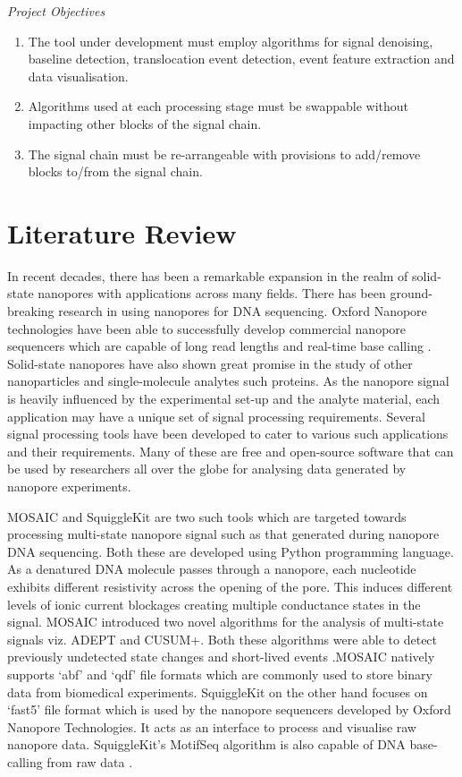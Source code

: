 \documentclass[journal]{IEEEtran}
\begin{document}
\noindent \textit{Project Objectives}
\begin{enumerate}
\item {The tool under development must employ algorithms for signal denoising, baseline detection, translocation event detection, event feature extraction and data visualisation.}
\item {Algorithms used at each processing stage must be swappable without impacting other blocks of the signal chain.}
\item {The signal chain must be re-arrangeable with provisions to add/remove blocks to/from the signal chain.}
\end{enumerate}

\section{Literature Review}
In recent decades, there has been a remarkable expansion in the realm of solid-state nanopores with applications across many fields. There has been ground-breaking research in using nanopores for DNA sequencing. Oxford Nanopore technologies have been able to successfully develop commercial nanopore sequencers which are capable of long read lengths and real-time base calling \cite{ipMinIONAnalysisReference2015}. Solid-state nanopores have also shown great promise in the study of other nanoparticles and single-molecule analytes such proteins. As the nanopore signal is heavily influenced by the experimental set-up and the analyte material, each application may have a unique set of signal processing requirements. Several signal processing tools have been developed to cater to various such applications and their requirements. Many of these are free and open-source software that can be used by researchers all over the globe for analysing data generated by nanopore experiments.

MOSAIC \cite{forstaterMOSAICModularSingleMolecule2016} and SquiggleKit \cite{fergusonSquiggleKitToolkitManipulating2019} are two such tools which are targeted towards processing multi-state nanopore signal such as that generated during nanopore DNA sequencing. Both these are developed using Python programming language. As a denatured DNA molecule passes through a nanopore, each nucleotide exhibits different resistivity across the opening of the pore. This induces different levels of ionic current blockages creating multiple conductance states in the signal. MOSAIC introduced two novel algorithms for the analysis of multi-state signals viz. ADEPT and CUSUM+. Both these algorithms were able to detect previously undetected state changes and short-lived events \cite{forstaterMOSAICModularSingleMolecule2016}.MOSAIC natively supports ‘abf’ and ‘qdf’ file formats which are commonly used to store binary data from biomedical experiments. SquiggleKit on the other hand focuses on ‘fast5’ file format which is used by the nanopore sequencers developed by Oxford Nanopore Technologies. It acts as an interface to process and visualise raw nanopore data. SquiggleKit’s MotifSeq algorithm is also capable of DNA base-calling from raw data \cite{fergusonSquiggleKitToolkitManipulating2019}.
\end{document}
